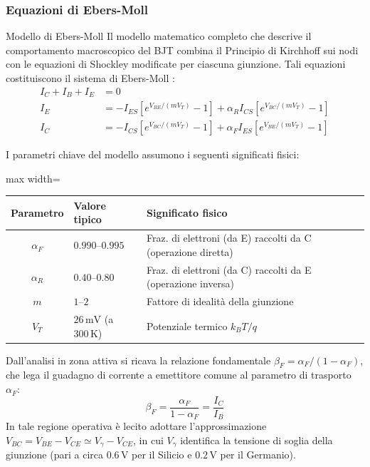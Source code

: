 \subsubsection{Equazioni di Ebers-Moll}
\begin{teorema}{Modello di Ebers-Moll}
    Il modello matematico completo che descrive il comportamento macroscopico del BJT combina il Principio di Kirchhoff sui nodi con le equazioni di Shockley modificate per ciascuna giunzione. Tali equazioni costituiscono il sistema di Ebers-Moll \cite{sedra}:
    \begin{align}
        I_C + I_B + I_E &= 0 \tag{KCL}\\
        I_E &= -I_{ES}\!\left[e^{V_{BE}/(mV_T)}-1\right]
             + \alpha_R I_{CS}\!\left[e^{V_{BC}/(mV_T)}-1\right] \tag{E--M Emit.}\\
        I_C &= -I_{CS}\!\left[e^{V_{BC}/(mV_T)}-1\right]
             + \alpha_F I_{ES}\!\left[e^{V_{BE}/(mV_T)}-1\right] \tag{E--M Coll.}
    \end{align}
    
    I parametri chiave del modello assumono i seguenti significati fisici:
    \begin{center}
    \begin{adjustbox}{max width=\textwidth}
    \renewcommand{\arraystretch}{1.2}
    \begin{tabular}{cll}
        \hline
        \textbf{Parametro} & \textbf{Valore tipico} & \textbf{Significato fisico} \\
        \hline
        $\alpha_F$ & $0.990$--$0.995$ & Fraz. di elettroni (da E) raccolti da C (operazione diretta) \\
        $\alpha_R$ & $0.40$--$0.80$  & Fraz. di elettroni (da C) raccolti da E (operazione inversa) \\
        $m$        & $1$--$2$        & Fattore di idealità della giunzione \\
        $V_T$      & $26\,\mathrm{mV}$ (a $300\,\mathrm{K}$) & Potenziale termico $k_BT/q$ \\
        \hline
    \end{tabular}
    \end{adjustbox}
    \end{center}
    
    Dall'analisi in zona attiva si ricava la relazione fondamentale $\beta_F = \alpha_F/(1-\alpha_F)$, che lega il guadagno di corrente a emettitore comune al parametro di trasporto $\alpha_F$:
    \begin{equation}
        \boxed{\beta_F = \frac{\alpha_F}{1-\alpha_F} = \frac{I_C}{I_B}}
    \end{equation}
    In tale regione operativa è lecito adottare l'approssimazione $V_{BC} = V_{BE} - V_{CE} \simeq V_\gamma - V_{CE}$, in cui $V_\gamma$ identifica la tensione di soglia della giunzione (pari a circa $0.6\,\mathrm{V}$ per il Silicio e $0.2\,\mathrm{V}$ per il Germanio).
\end{teorema}

